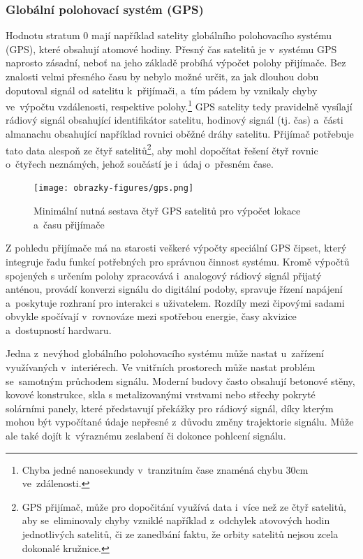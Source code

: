\subsubsection{Globální polohovací systém (GPS)}
Hodnotu stratum 0 mají například satelity globálního polohovacího systému (GPS), které obsahují atomové hodiny. Přesný čas satelitů je v~systému GPS naprosto zásadní, neboť na jeho základě probíhá výpočet polohy přijímače. Bez znalosti velmi přesného času by nebylo možné určit, za jak dlouhou dobu doputoval signál od satelitu k~přijímači, a~tím pádem by vznikaly chyby ve~výpočtu vzdálenosti, respektive polohy.\footnote{Chyba jedné nanosekundy v~tranzitním čase znaméná chybu 30cm ve~zdálenosti.} GPS satelity tedy pravidelně vysílají rádiový signál obsahující identifikátor satelitu, hodinový signál (tj. čas) a~části almanachu obsahující například rovnici oběžné dráhy satelitu. Přijímač potřebuje tato data alespoň ze čtyř satelitů\footnote{GPS přijímač, může pro dopočitání využívá data i~více než ze čtyř satelitů, aby se~eliminovaly chyby vzniklé například z~odchylek atovových hodin jednotlivých satelitů, či ze zanedbání faktu, že orbity satelitů nejsou zcela dokonalé kružnice.}, aby mohl dopočítat řešení čtyř rovnic o~čtyřech neznámých, jehož součástí je i~údaj o~přesném čase.~\cite{sparkfun_gps}

\begin{figure}[h]
    \centering
    \texttt{[image: obrazky-figures/gps.png]}
    
    \caption{Minimální nutná sestava čtyř GPS satelitů pro výpočet lokace a~času přijímače~\cite{time_theory_gps}}
    \label{fig:low-power-modes}
\end{figure}

Z pohledu přijímače má na starosti veškeré výpočty speciální GPS čipset, který integruje řadu funkcí potřebných pro správnou činnost systému. Kromě výpočtů spojených s určením polohy zpracovává i~analogový rádiový signál přijatý anténou, provádí konverzi signálu do digitální podoby, spravuje řízení napájení a~poskytuje rozhraní pro interakci s uživatelem. Rozdíly mezi čipovými sadami obvykle spočívají v~rovnováze mezi spotřebou energie, časy akvizice a~dostupností hardwaru.~\cite{sparkfun_gps}

Jedna z~nevýhod globálního polohovacího systému může nastat u~zařízení využívaných v~interiérech. Ve vnitřních prostorech může nastat problém se~samotným průchodem signálu. Moderní budovy často obsahují betonové stěny, kovové konstrukce, skla s metalizovanými vrstvami nebo střechy pokryté solárními panely, které představují překážky pro rádiový signál, díky kterým mohou být vypočítané údaje nepřesné z~důvodu změny trajektorie signálu. Může ale také dojít k~výraznému zeslabení či dokonce pohlcení signálu.~\cite{sparkfun_gps}


